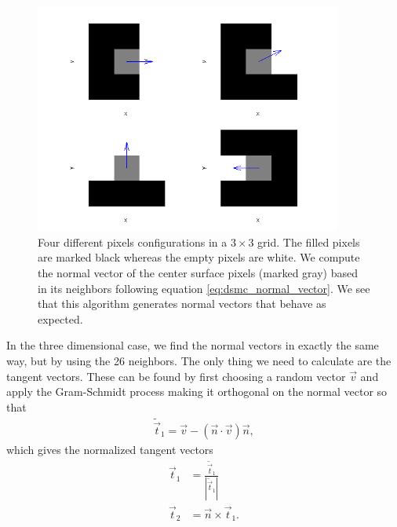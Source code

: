 \begin{figure}[ht]
\begin{center}
\includegraphics[width=0.9\textwidth, trim=0cm 0cm 0cm 0cm, clip]{DSMC/figures/normal_vectors.png}
\end{center}
\caption{Four different pixels configurations in a $3\times 3$ grid. The filled pixels are marked black whereas the empty pixels are white. We compute the normal vector of the center surface pixels (marked gray) based in its neighbors following equation \eqref{eq:dsmc_normal_vector}. We see that this algorithm generates normal vectors that behave as expected.}
\label{fig:dsmc_normal_vectors}
\end{figure}
In the three dimensional case, we find the normal vectors in exactly the same way, but by using the 26 neighbors. The only thing we need to calculate are the tangent vectors. These can be found by first choosing a random vector $\vec v$ and apply the Gram-Schmidt process making it orthogonal on the normal vector so that
\begin{align}
	\tilde{\vec t}_1 = \vec v - (\vec n\cdot \vec v)\vec n,
\end{align}
which gives the normalized tangent vectors
\begin{align}
	\vec t_1 &= \frac{ \tilde{\vec t}_1}{|\tilde{\vec t}_1|}\\
	\vec t_2 &= \vec n\times \vec t_1.
\end{align}